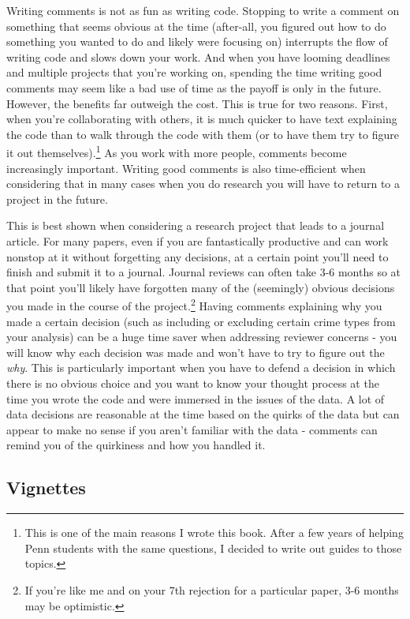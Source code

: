 \documentclass[
]{krantz}
\begin{document}
Writing comments is not as fun as writing code. Stopping to write a comment on something that seems obvious at the time (after-all, you figured out how to do something you wanted to do and likely were focusing on) interrupts the flow of writing code and slows down your work. And when you have looming deadlines and multiple projects that you're working on, spending the time writing good comments may seem like a bad use of time as the payoff is only in the future. However, the benefits far outweigh the cost. This is true for two reasons. First, when you're collaborating with others, it is much quicker to have text explaining the code than to walk through the code with them (or to have them try to figure it out themselves).\footnote{This is one of the main reasons I wrote this book. After a few years of helping Penn students with the same questions, I decided to write out guides to those topics.} As you work with more people, comments become increasingly important. Writing good comments is also time-efficient when considering that in many cases when you do research you will have to return to a project in the future.

This is best shown when considering a research project that leads to a journal article. For many papers, even if you are fantastically productive and can work nonstop at it without forgetting any decisions, at a certain point you'll need to finish and submit it to a journal. Journal reviews can often take 3-6 months so at that point you'll likely have forgotten many of the (seemingly) obvious decisions you made in the course of the project.\footnote{If you're like me and on your 7th rejection for a particular paper, 3-6 months may be optimistic.} Having comments explaining why you made a certain decision (such as including or excluding certain crime types from your analysis) can be a huge time saver when addressing reviewer concerns - you will know why each decision was made and won't have to try to figure out the \emph{why}. This is particularly important when you have to defend a decision in which there is no obvious choice and you want to know your thought process at the time you wrote the code and were immersed in the issues of the data. A lot of data decisions are reasonable at the time based on the quirks of the data but can appear to make no sense if you aren't familiar with the data - comments can remind you of the quirkiness and how you handled it.

\hypertarget{vignettes}{%
\subsection{Vignettes}\label{vignettes}}
\end{document}
